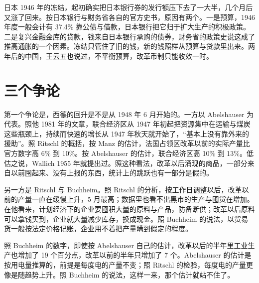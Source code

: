 \begin{pitfall}[冻结存款就能止住通胀]
日本 1946 年的冻结，起初确实把日本银行券的发行额压下去了一大半，几个月后又涨了回来\cite{boj1985}。按日本银行与财务省各自的官方史书，原因有两个。一是预算，1946 年度一般会计有 37.4\% 靠公债与借款，日本银行把它归于扩大生产的积极政策\cite{boj1985}。二是复兴金融金库的贷款，钱来自日本银行承购的债券，财务省的政策史说这成了推高通胀的一个因素\cite{mof2010}。冻结只管住了旧的钱，新的钱照样从预算与贷款里出来。两年后的中国，王云五也说过，不平衡预算，改革币制只能收效一时\cite{wang1948}。
\end{pitfall}

\section{三个争论}\label{sec:reconstruction-debate}

第一个争论是，西德的回升是不是从 1948 年 6 月开始的。一方以 Abelshauser 为代表。照他 1981 年的文章，联合经济区从 1947 年初起把资源集中在运输与煤炭这些瓶颈上，持续而快速的增长从 1947 年秋天就开始了，“基本上没有靠外来的援助”\cite{abelshauser1981}。照 Ritschl 的概括，按 Manz 的估计，法国占领区改革以前的实际产量比官方数字高 6\% 到 10\%\cite{ritschl1985}。按 Abelshauser 的估计，联合经济区高 10\% 到 13\%\cite{ritschl1985}。低估之说，Wallich 1955 年就提出过\cite{ritschl1985}。照这种看法，改革以后涌现的商品，一部分来自以前囤起来、没有上报的东西，统计上的跳跃也有一部分是假的。

另一方是 Ritschl 与 Buchheim。照 Ritschl 的分析，按工作日调整以后，改革以前的产量一直在缓慢上升，5 月最高；数据里也看不出黑市的生产与囤货在增加\cite{ritschl1985}。在他看来，计划经济下的企业要囤积大量的原料与产品，防备断供；改革以后原料可以拿钱买到，企业就大量减少库存，换成现金\cite{ritschl1985}。照 Buchheim 的说法，以货易货一般按法定价格记账，企业用不着把产量瞒到假定的程度\cite{buchheim1988}。

照 Buchheim 的数字，即使按 Abelshauser 自己的估计，改革以后的半年里工业生产也增加了 19 个百分点，改革以前的半年只增加了 7 个\cite{buchheim1988}。Abelshauser 的估计是按用电量推算的，前提是每度电的产量不变；照 Ritschl 的检验，每度电的产量更像是随趋势上升\cite{ritschl1985}。照 Buchheim 的说法，这样一来，那个估计就站不住了\cite{buchheim1988}。

